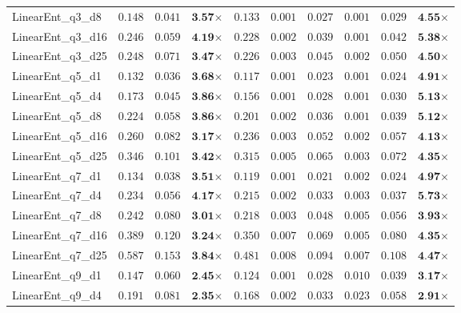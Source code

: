 \begin{table*}[t]
{\begin{tabular}{| l || r r c || r r r r r c |}
LinearEnt\_q3\_d8 & $0.148$ & $0.041$ & $\textbf{3.57}$$\times$ & $0.133$ & $0.001$ & $0.027$ & $0.001$ & $0.029$ & $\textbf{4.55}$$\times$ \\
LinearEnt\_q3\_d16 & $0.246$ & $0.059$ & $\textbf{4.19}$$\times$ & $0.228$ & $0.002$ & $0.039$ & $0.001$ & $0.042$ & $\textbf{5.38}$$\times$ \\
LinearEnt\_q3\_d25 & $0.248$ & $0.071$ & $\textbf{3.47}$$\times$ & $0.226$ & $0.003$ & $0.045$ & $0.002$ & $0.050$ & $\textbf{4.50}$$\times$ \\
LinearEnt\_q5\_d1 & $0.132$ & $0.036$ & $\textbf{3.68}$$\times$ & $0.117$ & $0.001$ & $0.023$ & $0.001$ & $0.024$ & $\textbf{4.91}$$\times$ \\
LinearEnt\_q5\_d4 & $0.173$ & $0.045$ & $\textbf{3.86}$$\times$ & $0.156$ & $0.001$ & $0.028$ & $0.001$ & $0.030$ & $\textbf{5.13}$$\times$ \\
LinearEnt\_q5\_d8 & $0.224$ & $0.058$ & $\textbf{3.86}$$\times$ & $0.201$ & $0.002$ & $0.036$ & $0.001$ & $0.039$ & $\textbf{5.12}$$\times$ \\
LinearEnt\_q5\_d16 & $0.260$ & $0.082$ & $\textbf{3.17}$$\times$ & $0.236$ & $0.003$ & $0.052$ & $0.002$ & $0.057$ & $\textbf{4.13}$$\times$ \\
LinearEnt\_q5\_d25 & $0.346$ & $0.101$ & $\textbf{3.42}$$\times$ & $0.315$ & $0.005$ & $0.065$ & $0.003$ & $0.072$ & $\textbf{4.35}$$\times$ \\
LinearEnt\_q7\_d1 & $0.134$ & $0.038$ & $\textbf{3.51}$$\times$ & $0.119$ & $0.001$ & $0.021$ & $0.002$ & $0.024$ & $\textbf{4.97}$$\times$ \\
LinearEnt\_q7\_d4 & $0.234$ & $0.056$ & $\textbf{4.17}$$\times$ & $0.215$ & $0.002$ & $0.033$ & $0.003$ & $0.037$ & $\textbf{5.73}$$\times$ \\
LinearEnt\_q7\_d8 & $0.242$ & $0.080$ & $\textbf{3.01}$$\times$ & $0.218$ & $0.003$ & $0.048$ & $0.005$ & $0.056$ & $\textbf{3.93}$$\times$ \\
LinearEnt\_q7\_d16 & $0.389$ & $0.120$ & $\textbf{3.24}$$\times$ & $0.350$ & $0.007$ & $0.069$ & $0.005$ & $0.080$ & $\textbf{4.35}$$\times$ \\
LinearEnt\_q7\_d25 & $0.587$ & $0.153$ & $\textbf{3.84}$$\times$ & $0.481$ & $0.008$ & $0.094$ & $0.007$ & $0.108$ & $\textbf{4.47}$$\times$ \\
LinearEnt\_q9\_d1 & $0.147$ & $0.060$ & $\textbf{2.45}$$\times$ & $0.124$ & $0.001$ & $0.028$ & $0.010$ & $0.039$ & $\textbf{3.17}$$\times$ \\
LinearEnt\_q9\_d4 & $0.191$ & $0.081$ & $\textbf{2.35}$$\times$ & $0.168$ & $0.002$ & $0.033$ & $0.023$ & $0.058$ & $\textbf{2.91}$$\times$ \\

\end{tabular}}
\end{table*}
